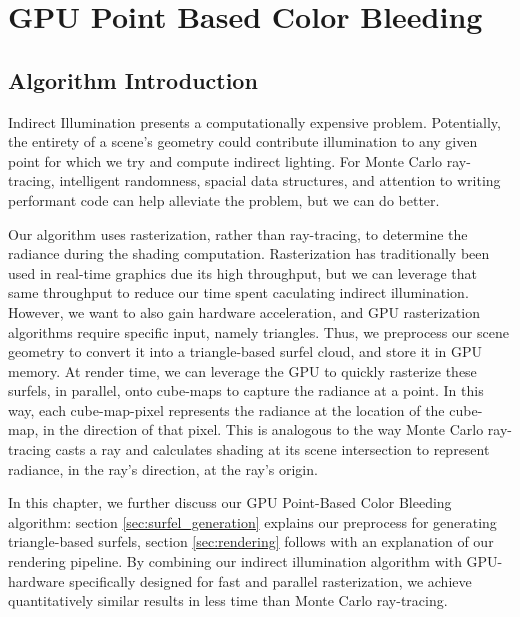\chapter{GPU Point Based Color Bleeding}

\section{Algorithm Introduction}

Indirect Illumination presents a computationally expensive problem. Potentially, the entirety of a scene's geometry could contribute illumination to any given point for which we try and compute indirect lighting. For Monte Carlo ray-tracing, intelligent randomness, spacial data structures, and attention to writing performant code can help alleviate the problem, but we can do better.

Our algorithm uses rasterization, rather than ray-tracing, to determine the radiance during the shading computation. Rasterization has traditionally been used in real-time graphics due its high throughput, but we can leverage that same throughput to reduce our time spent caculating indirect illumination. However, we want to also gain hardware acceleration, and GPU rasterization algorithms require specific input, namely triangles. Thus, we preprocess our scene geometry to convert it into a triangle-based surfel cloud, and store it in GPU memory. At render time, we can leverage the GPU to quickly rasterize these surfels, in parallel, onto cube-maps to capture the radiance at a point. In this way, each cube-map-pixel represents the radiance at the location of the cube-map, in the direction of that pixel. This is analogous to the way Monte Carlo ray-tracing casts a ray and calculates shading at its scene intersection to represent radiance, in the ray's direction, at the ray's origin.

In this chapter, we further discuss our GPU Point-Based Color Bleeding algorithm: section \ref{sec:surfel_generation} explains our preprocess for generating triangle-based surfels, section \ref{sec:rendering} follows with an explanation of our rendering pipeline. By combining our indirect illumination algorithm with GPU-hardware specifically designed for fast and parallel rasterization, we achieve quantitatively similar results in less time than Monte Carlo ray-tracing.

